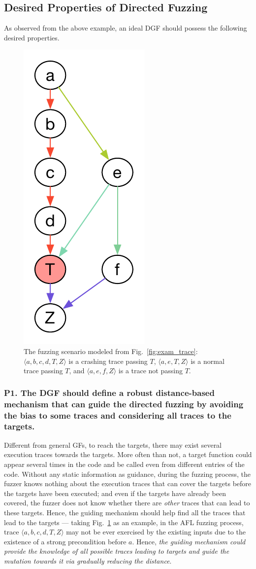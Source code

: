 \subsection{Desired Properties of Directed Fuzzing} \label{subsec:dp}





As observed from the above example, an ideal DGF should possess the following desired properties.




\begin{figure}[t]
	\centering
	\includegraphics[width=0.2\columnwidth]{res/dfot/eg_callchain.pdf}
	\vspace{-5pt}
	\caption{The fuzzing scenario modeled from Fig.~\ref{fig:exam_trace}: $\langle a, b, c, d, T, Z\rangle $ is a crashing trace passing $T$,  $\langle a, e, T, Z\rangle$ is a normal trace passing $T$, and $\langle a, e, f , Z\rangle$ is a trace not passing $T$.}
	\label{fig:call_chain}
\end{figure}

\subsubsection{\textbf{P1}. The DGF should define a \textbf{robust} distance-based mechanism that can guide the directed fuzzing by avoiding the bias to some traces and considering all traces to the targets.}  \label{subsec:p1}
Different from general GFs, to reach the targets, there may exist several execution traces towards the targets. More often than not, a target function could appear several times in the code and be called even from different entries of the code. Without any static information as guidance, during the fuzzing process, the fuzzer knows nothing about the execution traces that can cover the targets before the targets have been executed; and even if the targets have already been covered, the fuzzer does not know whether there are \emph{other} traces that can lead to these targets.  Hence, the guiding mechanism should help find all the traces that lead to the targets --- taking Fig.~\ref{fig:call_chain} as an example, in the AFL fuzzing process, trace $\langle a, b, c, d, T, Z\rangle$  may not be ever exercised by the existing inputs due to the existence of a strong precondition before $a$. Hence, \emph{the guiding mechanism could provide the knowledge of all possible traces leading to targets and guide the mutation towards it via gradually reducing the distance}. 

